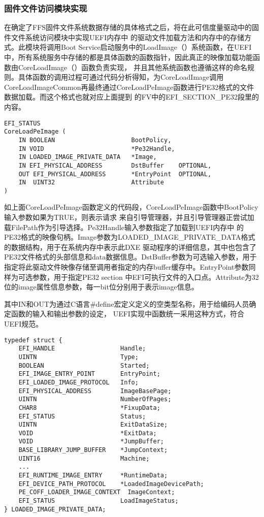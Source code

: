 \subsubsection{固件文件访问模块实现}
在确定了FFS固件文件系统数据存储的具体格式之后，将在此可信度量驱动中的固件文件系统访问模块中实现UEFI内存中
的驱动文件加载方法和内存中的存储方式。此模块将调用Boot Service启动服务中的LoadImage（）系统函数，在UEFI
中，所有系统服务中存储的都是具体函数的函数指针，因此真正的映像加载功能函数由CoreLoadImage（）函数负责实现，
并且其他系统函数也遵循这样的命名规则。具体函数的调用过程可通过代码分析得知，为CoreLoadImage调用
CoreLoadImageCommon再最终通过CoreLoadPeImage函数进行PE32格式的文件数据加载。而这个格式也就对应上面提到
的FV中的EFI\_SECTION\_PE32段里的内容。

\begin{lstlisting}
EFI_STATUS
CoreLoadPeImage (
    IN BOOLEAN                     BootPolicy,
    IN VOID                        *Pe32Handle,
    IN LOADED_IMAGE_PRIVATE_DATA   *Image,
    IN EFI_PHYSICAL_ADDRESS        DstBuffer    OPTIONAL,
    OUT EFI_PHYSICAL_ADDRESS       *EntryPoint  OPTIONAL,
    IN  UINT32                     Attribute
)
\end{lstlisting}

如上面CoreLoadPeImage函数定义的代码段，CoreLoadPeImage函数中BootPolicy输入参数如果为TRUE，则表示请求
来自引导管理器，并且引导管理器正尝试加载FilePath作为引导选择。Pe32Handle输入参数指定了加载到UEFI内存中
的PE32格式的映像句柄。Image参数为LOADED\_IMAGE\_PRIVATE\_DATA格式的数据结构，用于在系统内存中表示此DXE
驱动程序的详细信息，其中也包含了PE32文件格式的头部信息和data数据信息。DstBuffer参数为可选输入参数，用于
指定将此驱动文件映像存储至调用者指定的内存buffer缓存中。EntryPoint参数同样为可选参数，用于指定PE32 section
中EFI可执行文件的入口点。Attribute为32位的image属性信息参数，每一bit位分别用于表示image信息。
\par 其中IN和OUT为通过C语言\#define宏定义定义的空类型名称，用于给编码人员确定函数的输入和输出参数的设定，
UEFI实现中函数统一采用这种方式，符合UEFI规范。

\begin{lstlisting}
typedef struct {
    EFI_HANDLE                  Handle;   
    UINTN                       Type;           
    BOOLEAN                     Started;        
    EFI_IMAGE_ENTRY_POINT       EntryPoint;     
    EFI_LOADED_IMAGE_PROTOCOL   Info;           
    EFI_PHYSICAL_ADDRESS        ImageBasePage;  
    UINTN                       NumberOfPages;  
    CHAR8                       *FixupData;              
    EFI_STATUS                  Status;         
    UINTN                       ExitDataSize;   
    VOID                        *ExitData;      
    VOID                        *JumpBuffer;    
    BASE_LIBRARY_JUMP_BUFFER    *JumpContext;  
    UINT16                      Machine;     
    ...         
    EFI_RUNTIME_IMAGE_ENTRY     *RuntimeData;   
    EFI_DEVICE_PATH_PROTOCOL    *LoadedImageDevicePath;  
    PE_COFF_LOADER_IMAGE_CONTEXT  ImageContext; 
    EFI_STATUS                  LoadImageStatus;
} LOADED_IMAGE_PRIVATE_DATA;
\end{lstlisting}

